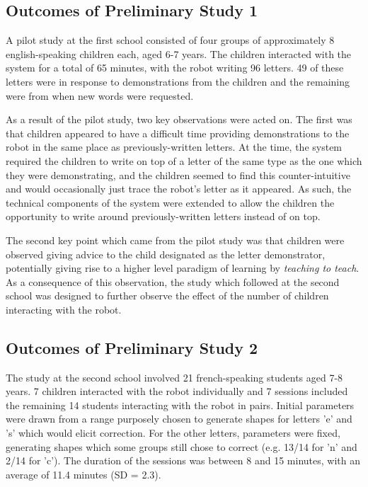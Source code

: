 \documentclass{sig-alternate}
\begin{document}
\subsection{Outcomes of Preliminary Study 1}


A pilot study at the first school consisted of four groups of
approximately 8 english-speaking children each, aged 6-7 years. The children
interacted with the system for a total of 65 minutes, with the robot writing 96
letters. 49 of these letters were in response to demonstrations from the children 
and the remaining were from when new words were requested. 

As a result of the pilot study, two key observations were acted on. The first
was that children appeared to have a difficult time providing demonstrations to
the robot in the same place as previously-written letters. At the time, the
system required the children to write on top of a letter of the same type as the
one which they were demonstrating, and the children seemed to find this
counter-intuitive and would occasionally just trace the robot's letter as it
appeared. As such, the technical components of the system were extended to allow
the children the opportunity to write around previously-written letters instead
of on top. 

The second key point which came from the pilot study was that children were
observed giving advice to the child designated as the letter demonstrator,
potentially giving rise to a higher level paradigm of learning by
\emph{teaching to teach}. As a consequence of this observation, the study which
followed at the second school was designed to further observe the effect of the
number of children interacting with the robot.

\subsection{Outcomes of Preliminary Study 2}
The study at the second school involved 21 french-speaking students aged 7-8 years. 7 children
interacted with the robot individually and 7 sessions included the remaining
14 students interacting with the robot in pairs.
Initial parameters were drawn from a range purposely chosen to generate shapes 
for letters 'e' and 's' which would elicit correction. For the other letters, 
parameters were fixed, generating shapes which some groups still chose to correct 
(e.g. 13/14 for 'n' and 2/14 for 'c'). The duration of the sessions
was between 8 and 15 minutes, with an average of 11.4 minutes (SD = 2.3). 
\end{document}
